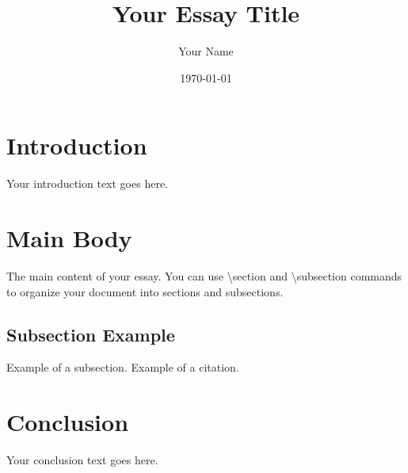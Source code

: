 \documentclass[11pt]{article}
\begin{document}
\title{Your Essay Title}
\author{Your Name}
\date{\today} %

\maketitle

\section{Introduction}
Your introduction text goes here. 

\section{Main Body}
The main content of your essay. You can use \textbackslash{}section and \textbackslash{}subsection commands to organize your document into sections and subsections.
\subsection{Subsection Example}
Example of a subsection.
Example of a citation\cite{latexcompanion}.

\section{Conclusion}
Your conclusion text goes here.

\end{document}
